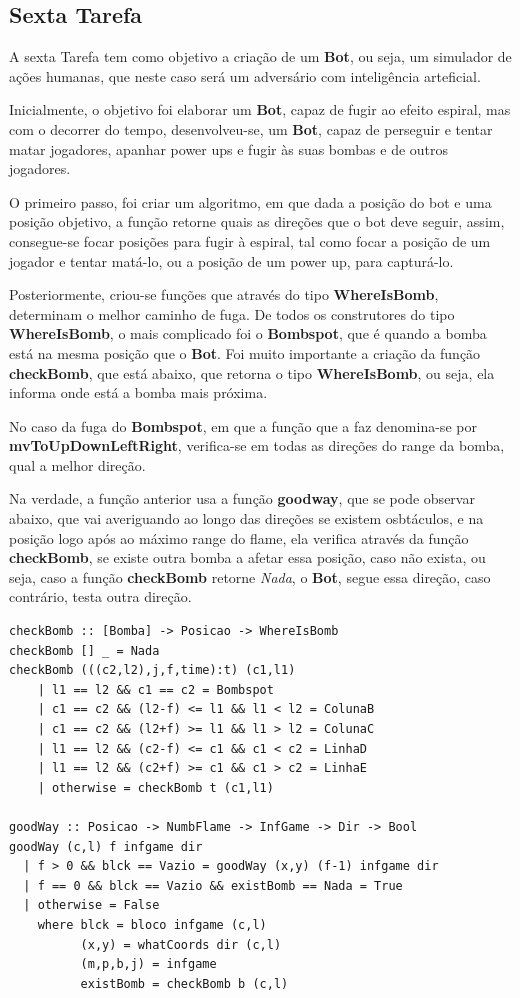 \documentclass[4apaper]{report}
\begin{document}
\subsection{Sexta Tarefa}

A sexta Tarefa tem como objetivo a criação de um \textbf{Bot}, ou seja, um simulador de ações humanas, que neste caso será um adversário com inteligência arteficial.

Inicialmente, o objetivo foi elaborar um \textbf{Bot}, capaz de fugir ao efeito espiral, mas com o decorrer do tempo, desenvolveu-se, um \textbf{Bot}, capaz de perseguir e tentar matar jogadores, apanhar power ups e fugir às suas bombas e de outros jogadores.

O primeiro passo, foi criar um algoritmo, em que dada a posição do bot e uma posição objetivo, a função retorne quais as direções que o bot deve seguir, assim, consegue-se focar posições para fugir à espiral, tal como focar a posição de um jogador e tentar matá-lo, ou a posição de um power up, para capturá-lo.

Posteriormente, criou-se funções que através do tipo \textbf{WhereIsBomb}, determinam o melhor caminho de fuga. De todos os construtores do tipo \textbf{WhereIsBomb}, o mais complicado foi o \textbf{Bombspot}, que é quando a bomba está na mesma posição que o \textbf{Bot}. Foi muito importante a criação da função \textbf{checkBomb}, que está abaixo, que retorna o tipo \textbf{WhereIsBomb}, ou seja, ela informa onde está a bomba mais próxima. 

No caso da fuga do \textbf{Bombspot}, em que a função que a faz denomina-se por \textbf{mvToUpDownLeftRight}, verifica-se em todas as direções do range da bomba, qual a melhor direção.

Na verdade, a função anterior usa a função \textbf{goodway}, que se pode observar abaixo, que vai averiguando ao longo das direções se existem osbtáculos, e na posição logo após ao máximo range do flame, ela verifica através da função \textbf{checkBomb}, se existe outra bomba a afetar essa posição, caso não exista, ou seja, caso a função \textbf{checkBomb} retorne \textit{Nada}, o \textbf{Bot}, segue essa direção, caso contrário, testa outra direção. 

\begin{verbatim}
checkBomb :: [Bomba] -> Posicao -> WhereIsBomb
checkBomb [] _ = Nada
checkBomb (((c2,l2),j,f,time):t) (c1,l1) 
    | l1 == l2 && c1 == c2 = Bombspot
    | c1 == c2 && (l2-f) <= l1 && l1 < l2 = ColunaB
    | c1 == c2 && (l2+f) >= l1 && l1 > l2 = ColunaC
    | l1 == l2 && (c2-f) <= c1 && c1 < c2 = LinhaD
    | l1 == l2 && (c2+f) >= c1 && c1 > c2 = LinhaE
    | otherwise = checkBomb t (c1,l1)

goodWay :: Posicao -> NumbFlame -> InfGame -> Dir -> Bool
goodWay (c,l) f infgame dir 
  | f > 0 && blck == Vazio = goodWay (x,y) (f-1) infgame dir
  | f == 0 && blck == Vazio && existBomb == Nada = True
  | otherwise = False 
    where blck = bloco infgame (c,l)
          (x,y) = whatCoords dir (c,l)
          (m,p,b,j) = infgame
          existBomb = checkBomb b (c,l) 
\end{verbatim}
\end{document}
